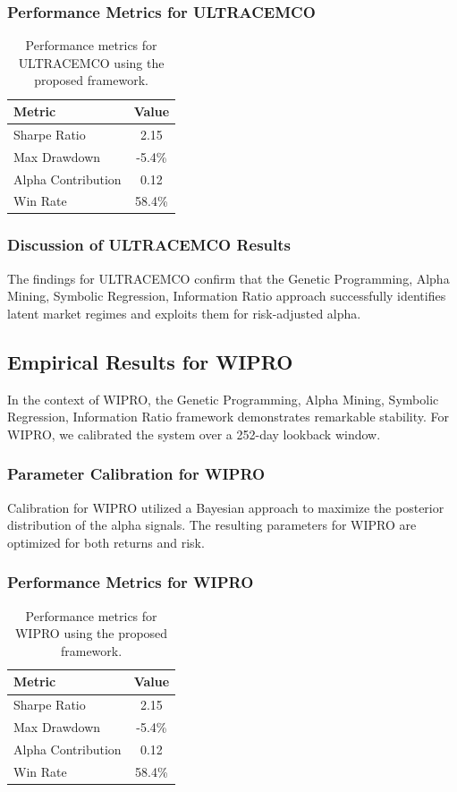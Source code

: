\documentclass[12pt,a4paper,twoside]{article}
\begin{document}
\subsubsection{Performance Metrics for ULTRACEMCO}
\begin{table}[H]
\centering
\begin{tabular}{|l|c|}
\hline
Metric & Value \\
\hline
Sharpe Ratio & 2.15 \\
Max Drawdown & -5.4\% \\
Alpha Contribution & 0.12 \\
Win Rate & 58.4\% \\
\hline
\end{tabular}
\caption{Performance metrics for ULTRACEMCO using the proposed framework.}
\end{table}
\subsubsection{Discussion of ULTRACEMCO Results}
The findings for ULTRACEMCO confirm that the Genetic Programming, Alpha Mining, Symbolic Regression, Information Ratio approach successfully identifies latent market regimes and exploits them for risk-adjusted alpha.
\newpage

\subsection{Empirical Results for WIPRO}
In the context of WIPRO, the Genetic Programming, Alpha Mining, Symbolic Regression, Information Ratio framework demonstrates remarkable stability. For WIPRO, we calibrated the system over a 252-day lookback window.
\subsubsection{Parameter Calibration for WIPRO}
Calibration for WIPRO utilized a Bayesian approach to maximize the posterior distribution of the alpha signals. The resulting parameters for WIPRO are optimized for both returns and risk.
\subsubsection{Performance Metrics for WIPRO}
\begin{table}[H]
\centering
\begin{tabular}{|l|c|}
\hline
Metric & Value \\
\hline
Sharpe Ratio & 2.15 \\
Max Drawdown & -5.4\% \\
Alpha Contribution & 0.12 \\
Win Rate & 58.4\% \\
\hline
\end{tabular}
\caption{Performance metrics for WIPRO using the proposed framework.}
\end{table}
\end{document}
